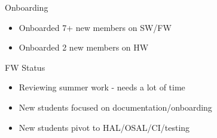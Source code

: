 \begin{frame}{Onboarding}
    \begin{itemize}
        \item Onboarded 7+ new members on SW/FW
        \item Onboarded 2 new members on HW
    \end{itemize}
\end{frame}

\begin{frame}{FW Status}
    \begin{itemize}
        \item Reviewing summer work - needs a lot of time
        \item New students focused on documentation/onboarding
        \item New students pivot to HAL/OSAL/CI/testing
    \end{itemize}
\end{frame}

